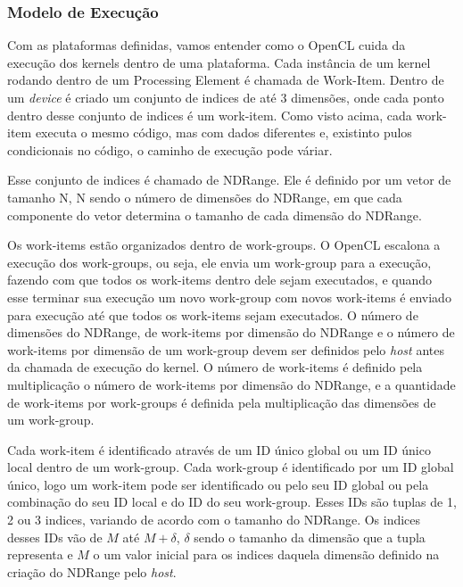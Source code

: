 \subsubsection{Modelo de Execução}

Com as plataformas definidas, vamos entender como o OpenCL cuida da execução dos kernels dentro de uma plataforma.
Cada instância de um kernel rodando dentro de um Processing Element é chamada de Work-Item. Dentro de um \textit{device}
é criado um conjunto de indices de até 3 dimensões, onde cada ponto dentro desse conjunto de indices é um work-item. 
Como visto acima, cada work-item executa o mesmo código, mas com dados diferentes e, existinto pulos condicionais no código, 
o caminho de execução pode váriar.

Esse conjunto de indices é chamado de NDRange. Ele é definido por um vetor de tamanho N, N sendo o número de dimensões do
NDRange, em que cada componente do vetor determina o tamanho de cada dimensão do NDRange. 

Os work-items estão organizados dentro de work-groups. O OpenCL escalona a execução dos work-groups, ou seja, ele envia um 
work-group para a execução, fazendo com que todos os work-items dentro dele sejam executados, e quando esse terminar sua 
execução um novo work-group com novos work-items é enviado para execução até que todos os work-items sejam executados. 
O número de dimensões do NDRange, de work-items por dimensão do NDRange e o número de work-items por dimensão de um work-group
devem ser definidos pelo \textit{host} antes da chamada de execução do kernel. O número de work-items é definido pela multiplicação
o número de work-items por dimensão do NDRange, e a quantidade de work-items por work-groups é definida pela multiplicação das dimensões
de um work-group.

Cada work-item é identificado através de um ID único global ou um ID único local dentro de um work-group. Cada work-group é identificado
por um ID global único, logo um work-item pode ser identificado ou pelo seu ID global ou pela combinação do seu ID local e do ID do seu 
work-group. Esses IDs são tuplas de 1, 2 ou 3 indices, variando de acordo com o tamanho do NDRange. Os indices desses IDs vão de $M$ até
$M+\delta$, $\delta$ sendo o tamanho da dimensão que a tupla representa e $M$ o um valor inicial para os indices daquela dimensão definido
na criação do NDRange pelo \textit{host}.

